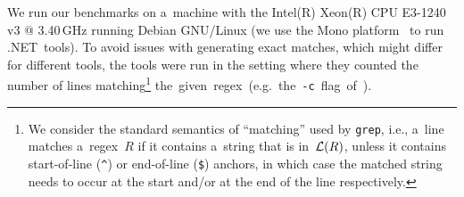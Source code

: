 \documentclass[acmsmall,screen]{acmart}
\begin{document}
We run our benchmarks on a~machine with the Intel(R) Xeon(R) CPU E3-1240 v3 @
3.40\,GHz running Debian GNU/Linux (we use the Mono
platform~\cite{mono} to run .NET~tools).
To avoid issues with generating exact matches,
which might differ for different tools,
the tools were run in the setting where they counted the number of lines
matching\footnote{%
We consider the standard semantics of ``matching'' used by \texttt{grep}, i.e.,
a~line matches a~regex~$R$ if it contains a~string that is in~$\mathcal{L}(R)$, unless it
contains start-of-line (\texttt{\^}) or end-of-line (\texttt{\$}) anchors, in which
case the matched string needs to occur at the start and/or at the end of the
line respectively.
}
\mbox{the given regex (e.g.\ the \texttt{-c} flag of \grep).}



\plotfigure

\vspace{-0.0mm}
\end{document}
